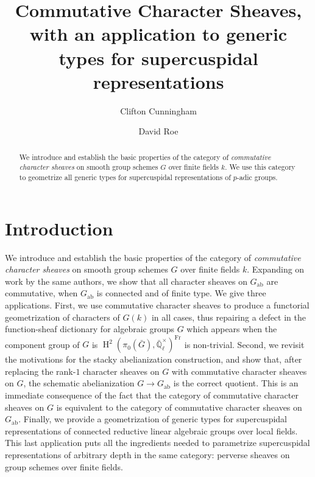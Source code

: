 \documentclass[10pt]{amsart}
\title[Commutative Character Sheaves]{Commutative Character Sheaves, with an application to generic types for supercuspidal representations}
\author{Clifton Cunningham}
\author{David Roe}
\theoremstyle{plain}
\theoremstyle{definition}
\newcommand{\EE}{\mathbb{\bar Q}_\ell}
\newcommand{\Fq}{k}
\newcommand{\EEx}{\EE^\times}
\newcommand{\Frob}[1]{\operatorname{Fr}_{#1}}
\DeclareMathOperator{\Hh}{H}
\newcommand{\ab}{_{\operatorname{ab}}}
\newcommand{\bG}{\bar{G}}
\begin{document}
\begin{abstract}
We introduce and establish the basic properties of  the category of \emph{commutative character sheaves} on smooth group schemes $G$ over finite fields $\Fq$. 
We use this category to geometrize all generic types for supercuspidal representations of $p$-adic groups. 
\end{abstract}

\maketitle

\section*{Introduction}
We introduce and establish the basic properties of  the category of \emph{commutative character sheaves} on smooth group schemes $G$ over finite fields $\Fq$. 
Expanding on work by the same authors, we show that all character sheaves on $G\ab$ are commutative, when $G\ab$ is connected and of finite type.
We give three applications.
First, we use commutative character sheaves to produce a functorial geometrization of characters of $G(\Fq)$ in all cases, thus repairing a defect in the function-sheaf dictionary for algebraic groups $G$ which appears when the component group of $G$ is $\Hh^2(\pi_0(\bG),\EEx)^{\Frob{}}$ is non-trivial. 
Second, we revisit the motivations for the stacky abelianization construction, and show that, after replacing the rank-$1$ character sheaves on $G$ with commutative character sheaves on $G$, the schematic abelianization $G \to G\ab$ is the correct quotient.
This is an immediate consequence of the fact that the category of commutative character sheaves on $G$ is equivalent to the category of commutative character sheaves on $G\ab$. 
Finally, we provide a geometrization of generic types for supercuspidal representations of connected reductive linear algebraic groups over local fields.
This last application puts all the ingredients needed to parametrize supercuspidal representations of arbitrary depth in the same category: perverse sheaves on group schemes over finite fields.
\end{document}
